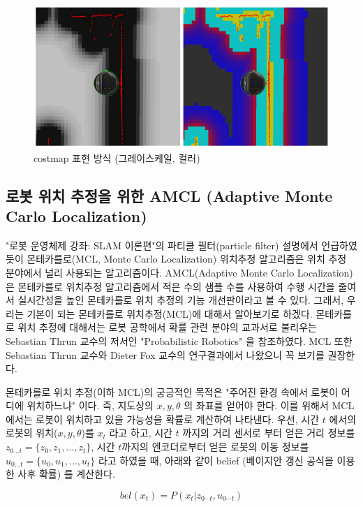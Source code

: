 \begin{figure}[h]
\centering
\includegraphics[width=0.8\columnwidth]{pictures/chapter11/costmap_gray.png}
\caption{costmap 표현 방식 (그레이스케일, 컬러)}
\end{figure}

\subsection{로봇 위치 추정을 위한 AMCL (Adaptive Monte Carlo Localization)}

"로봇 운영체제 강좌: SLAM 이론편"의 파티클 필터(particle filter) 설명에서 언급하였듯이 몬테카를로(MCL, Monte Carlo Localization) 위치추정 알고리즘은 위치 추정 분야에서 널리 사용되는 알고리즘이다. AMCL(Adaptive Monte Carlo Localization) 은 몬테카를로 위치추정 알고리즘에서 적은 수의 샘플 수를 사용하여 수행 시간을 줄여서 실시간성을 높인 몬테카를로 위치 추정의 기능 개선판이라고 볼 수 있다. 그래서, 우리는 기본이 되는 몬테카를로 위치추정(MCL)에 대해서 알아보기로 하겠다. 몬테카를로 위치 추정에 대해서는 로봇 공학에서 확률 관련 분야의 교과서로 불리우는 Sebastian Thrun 교수의 저서인 "Probabilistic Robotics"\cite{thrun2005probabilistic} 을 참조하였다. MCL 또한 Sebastian Thrun 교수와 Dieter Fox 교수의 연구결과\cite{fox1999monte}\cite{dellaert1999monte}에서 나왔으니 꼭 보기를 권장한다.

몬테카를로 위치 추정(이하 MCL)의 궁긍적인 목적은 "주어진 환경 속에서 로봇이 어디에 위치하느냐" 이다. 즉, 지도상의 $x, y, \theta$ 의 좌표를 얻어야 한다. 이를 위해서 MCL 에서는 로봇이 위치하고 있을 가능성을 확률로 계산하여 나타낸다. 우선, 시간 $t$ 에서의 로봇의 위치($x, y, \theta$)를  $x_t$ 라고 하고, 시간 $t$ 까지의 거리 센서로 부터 얻은 거리 정보를 $z_{0...t} = \{z_0, z_1, ..., z_t\}$, 시간 $t$까지의 엔코더로부터 얻은 로봇의 이동 정보를 $u_{0...t} = \{u_0, u_1, ..., u_t\}$ 라고 하였을 때, 아래와 같이 belief (베이지안 갱신 공식을 이용한 사후 확률) 를 계산한다.

\begin{equation}
  bel(x_t) = P(x_t|z_{0\cdots t},u_{0\cdots t})
\end{equation}

